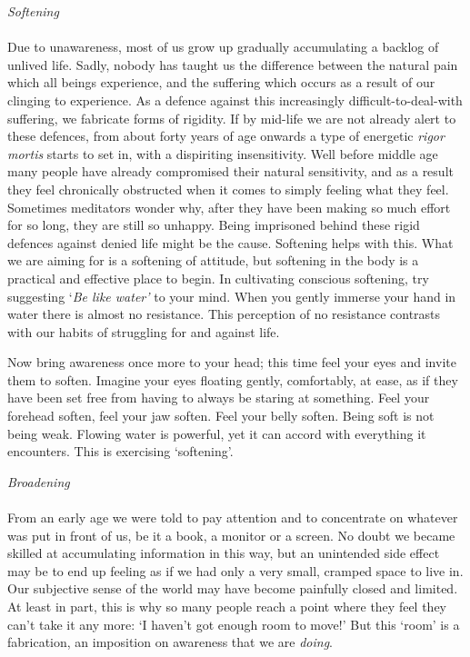 \emph{Softening\\
~\\
}Due to unawareness, most of us grow up gradually accumulating a backlog
of unlived life. Sadly, nobody has taught us the difference between the
natural pain which all beings experience, and the suffering which occurs
as a result of our clinging to experience. As a defence against this
increasingly difficult-to-deal-with suffering, we fabricate forms of
rigidity. If by mid-life we are not already alert to these defences,
from about forty years of age onwards a type of energetic \emph{rigor
mortis} starts to set in, with a dispiriting insensitivity. Well before
middle age many people have already compromised their natural
sensitivity, and as a result they feel chronically obstructed when it
comes to simply feeling what they feel. Sometimes meditators wonder why,
after they have been making so much effort for so long, they are still
so unhappy. Being imprisoned behind these rigid defences against denied
life might be the cause. Softening helps with this. What we are aiming
for is a softening of attitude, but softening in the body is a practical
and effective place to begin. In cultivating conscious softening, try
suggesting `\emph{Be like water'} to your mind. When you gently immerse
your hand in water there is almost no resistance. This perception of no
resistance contrasts with our habits of struggling for and against life.

Now bring awareness once more to your head; this time feel your eyes and
invite them to soften. Imagine your eyes floating gently, comfortably,
at ease, as if they have been set free from having to always be staring
at something. Feel your forehead soften, feel your jaw soften. Feel your
belly soften. Being soft is not being weak. Flowing water is powerful,
yet it can accord with everything it encounters. This is exercising
`softening'.

\emph{Broadening\\
~\\
}From an early age we were told to pay attention and to concentrate on
whatever was put in front of us, be it a book, a monitor or a screen. No
doubt we became skilled at accumulating information in this way, but an
unintended side effect may be to end up feeling as if we had only a very
small, cramped space to live in. Our subjective sense of the world may
have become painfully closed and limited. At least in part, this is why
so many people reach a point where they feel they can't take it any
more: `I haven't got enough room to move!' But this `room' is a
fabrication, an imposition on awareness that we are \emph{doing}.

